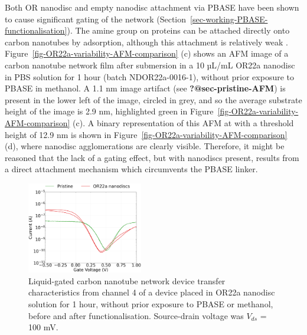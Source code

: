 \documentclass[
  a4paper,
]{scrbook}
\begin{document}
Both OR nanodisc and empty nanodisc attachment via PBASE have been shown
to cause significant gating of the network
(Section~\ref{sec-working-PBASE-functionalisation}). The amine group on
proteins can be attached directly onto carbon nanotubes by adsorption,
although this attachment is relatively weak \autocite{Bradley2004}.
Figure~\ref{fig-OR22a-variability-AFM-comparison} (c) shows an AFM image
of a carbon nanotube network film after submersion in a 10 µL/mL OR22a
nanodisc in PBS solution for 1 hour (batch NDOR22a-0016-1), without
prior exposure to PBASE in methanol. A 1.1 nm image artifact (see
\textbf{?@sec-pristine-AFM}) is present in the lower left of the image,
circled in grey, and so the average substrate height of the image is 2.9
nm, highlighted green in
Figure~\ref{fig-OR22a-variability-AFM-comparison} (c). A binary
representation of this AFM at with a threshold height of 12.9 nm is
shown in Figure~\ref{fig-OR22a-variability-AFM-comparison} (d), where
nanodisc agglomerations are clearly visible. Therefore, it might be
reasoned that the lack of a gating effect, but with nanodiscs present,
results from a direct attachment mechanism which circumvents the PBASE
linker.

\begin{figure}

{\centering \includegraphics[width=0.45\textwidth,height=\textheight]{figures/ch8/Q4C8_ch4_without_gate_current.png}

}

\caption{\label{fig-OR22a-variability-TX-comparison}Liquid-gated carbon
nanotube network device transfer characteristics from channel 4 of a
device placed in OR22a nanodisc solution for 1 hour, without prior
exposure to PBASE or methanol, before and after functionalisation.
Source-drain voltage was \(V_{ds}\) = 100 mV.}

\end{figure}
\end{document}
